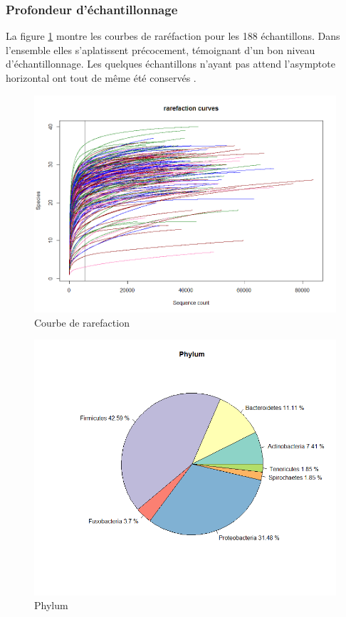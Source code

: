 \documentclass[12pt,a4paper]{article}
\begin{document}
\subsubsection{Profondeur d’échantillonnage}
La figure \ref{rarefaction} montre les courbes de raréfaction pour les 188 échantillons.
Dans l'ensemble elles s’aplatissent précocement, témoignant d’un bon niveau d'échantillonnage. Les quelques échantillons n'ayant pas attend l'asymptote horizontal ont tout de même été conservés . 

\begin{figure}[!h]
\begin{center}
\includegraphics[scale=0.5]{img/rarefaction.png}\hfill
\end{center}
\caption{Courbe de rarefaction}
\label{rarefaction}
\end{figure}


\begin{figure}[!ht]
\begin{center}
\includegraphics[scale=0.5]{img/phylum.png}\hfill
\end{center}
\caption{Phylum}
\label{phylum}
\end{figure}
\end{document}
